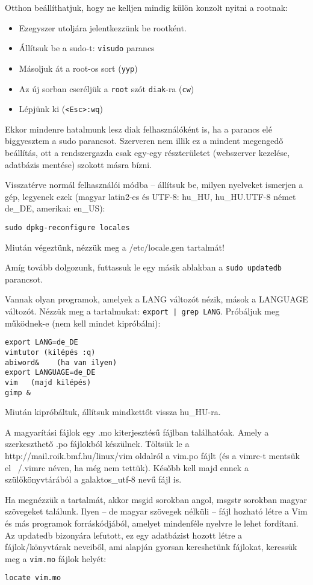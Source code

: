\documentclass[a4paper]{article}
\newcommand{\alapcim}{http://mail.roik.bmf.hu/linux}
\newcommand{\code}{\texttt}
\begin{document}
Otthon beállíthatjuk, hogy ne kelljen mindig külön
konzolt nyitni a rootnak:
\begin{itemize}
\item Ezegyszer utoljára jelentkezzünk be rootként.
\item Állítsuk be a sudo-t: \code{visudo} parancs
\item Másoljuk át a root-os sort (\code{yyp})
\item Az új sorban cseréljük a \code{root} szót \code{diak}-ra (\code{cw})
\item Lépjünk ki (\code{<Esc>:wq})
\end{itemize}
Ekkor mindenre hatalmunk lesz diak felhasználóként is, ha a parancs elé
biggyesztem a sudo parancsot. Szerveren nem illik ez a mindent
megengedő beállítás, ott a rendszergazda csak egy-egy részterületet
(webszerver kezelése, adatbázis mentése) szokott másra bízni.

Visszatérve normál felhasználói módba -- állítsuk be, milyen
nyelveket ismerjen a gép, legyenek ezek (magyar latin2-es és UTF-8:
hu\_HU, hu\_HU.UTF-8 német de\_DE, amerikai: en\_US):
\begin{Verbatim}
sudo dpkg-reconfigure locales
\end{Verbatim}
Miután végeztünk, nézzük meg a /etc/locale.gen tartalmát!

Amíg tovább dolgozunk, futtassuk le egy másik ablakban a \code{sudo
updatedb} parancsot.

Vannak olyan programok, amelyek a LANG változót nézik, mások a LANGUAGE
változót. Nézzük meg a tartalmukat: \code{export | grep LANG}.
Próbáljuk meg működnek-e (nem kell mindet kipróbálni):
\begin{Verbatim}
export LANG=de_DE
vimtutor (kilépés :q)
abiword&	(ha van ilyen)
export LANGUAGE=de_DE
vim   (majd kilépés)
gimp &
\end{Verbatim}
Miután kipróbáltuk, állítsuk mindkettőt vissza hu\_HU-ra.

A magyarítási fájlok egy .mo kiterjesztésű fájlban találhatóak. Amely a
szerkeszthető .po fájlokból készülnek. Töltsük le a \alapcim/vim
oldalról a vim.po fájlt (és a vimrc-t mentsük el ~/.vimrc néven, ha még
nem tettük). Később kell majd ennek a szülőkönyvtárából a galaktos\_utf-8
nevű fájl is.

Ha megnézzük a tartalmát, akkor msgid sorokban angol, msgstr sorokban
magyar szövegeket találunk. Ilyen -- de magyar szövegek nélküli -- fájl
hozható létre a Vim  és más programok forráskódjából, amelyet mindenféle
nyelvre le lehet fordítani. Az updatedb bizonyára lefutott, ez egy
adatbázist hozott létre a fájlok/könyvtárak neveiből, ami alapján
gyorsan kereshetünk fájlokat, keressük meg a \code{vim.mo} fájlok
helyét:
\begin{Verbatim}
locate vim.mo
\end{Verbatim}
\end{document}
